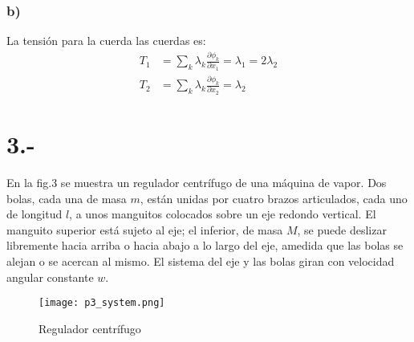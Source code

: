 \documentclass{article}
\begin{document}
\begin{tcolorbox}[breakable]
    \subsubsection*{b)}
    La tensión para la cuerda las cuerdas es:
    \begin{align*}
        T_1 &= \sum_k \lambda_k \frac{\partial \phi_k}{\partial x_1} = \lambda_1 = 2\lambda_2 \\
        T_2 &= \sum_k \lambda_k \frac{\partial \phi_k}{\partial x_2} = \lambda_2
    \end{align*}

\end{tcolorbox}
\newpage
\section*{3.-}
En la fig.3 se muestra un regulador centrífugo de una máquina de vapor. Dos bolas, cada una de masa $m$, están unidas por cuatro brazos articulados, 
cada uno de longitud $l$, a unos manguitos colocados sobre un eje redondo vertical. El manguito superior está sujeto al eje; el inferior, de masa $M$, 
se puede deslizar libremente hacia arriba o hacia abajo a lo largo del eje, amedida que las bolas se alejan o se acercan al mismo. 
El sistema del eje y las bolas giran con velocidad angular constante $w$.
\begin{figure}[H]
    \centering
    \texttt{[image: p3\_system.png]}
    \caption{Regulador centrífugo}
\end{figure}
\end{document}
